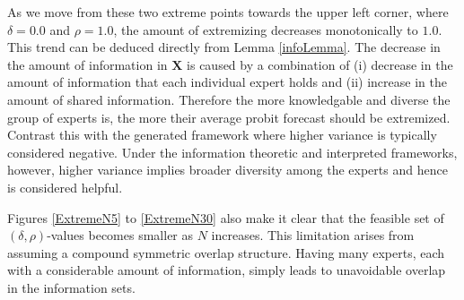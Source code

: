 \documentclass[11pt,twoside]{article}
\begin{document}
 As we move from these two extreme points towards the upper left corner, where $\delta = 0.0$ and $\rho = 1.0$, the amount of extremizing decreases monotonically to $1.0$. This trend can be deduced directly from Lemma \ref{infoLemma}. The decrease in the amount of information in $\boldsymbol{X}$  is caused by a combination of (i) decrease in the amount of information that each individual expert holds and (ii) increase in the amount of shared information. Therefore the more knowledgable and diverse the group of experts is, the more their average probit forecast should be extremized. Contrast this with the generated framework where higher variance is typically considered negative. Under the information theoretic and interpreted frameworks, however, higher variance implies broader diversity among the experts and hence is considered helpful. 

Figures \ref{ExtremeN5} to \ref{ExtremeN30} also make it clear that the feasible set of $(\delta, \rho)$-values becomes smaller as $N$ increases. This limitation arises from assuming a compound symmetric overlap structure. Having many experts, each with a considerable amount of information, simply leads to unavoidable overlap in the information sets. 


\end{document}
